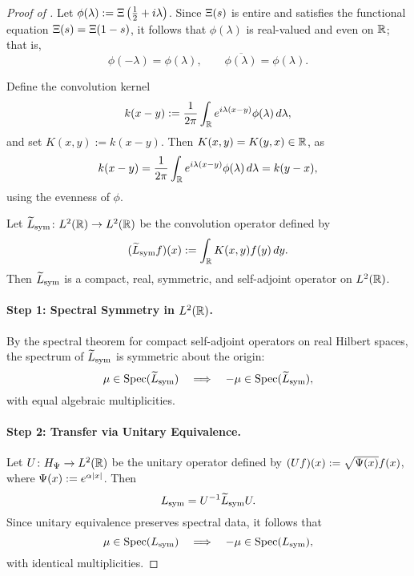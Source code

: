 \begin{proof}[Proof of ]
Let \( \phi(\lambda) := \Xi\left(\tfrac{1}{2} + i\lambda\right) \). Since \( \Xi(s) \) is entire and satisfies the functional equation \( \Xi(s) = \Xi(1 - s) \), it follows that \( \phi(\lambda) \) is real-valued and even on \( \mathbb{R} \); that is,
\[
\phi(-\lambda) = \phi(\lambda), \qquad \overline{\phi(\lambda)} = \phi(\lambda).
\]

Define the convolution kernel
\[
k(x - y) := \frac{1}{2\pi} \int_{\mathbb{R}} e^{i\lambda(x - y)} \phi(\lambda)\, d\lambda,
\]
and set \( K(x, y) := k(x - y) \). Then \( K(x, y) = K(y, x) \in \mathbb{R} \), as
\[
k(x - y) = \frac{1}{2\pi} \int_{\mathbb{R}} e^{i\lambda(x - y)} \phi(\lambda)\, d\lambda = k(y - x),
\]
using the evenness of \( \phi \).

Let \( \widetilde{L}_{\mathrm{sym}} \colon L^2(\mathbb{R}) \to L^2(\mathbb{R}) \) be the convolution operator defined by
\[
(\widetilde{L}_{\mathrm{sym}} f)(x) := \int_{\mathbb{R}} K(x, y) f(y)\, dy.
\]
Then \( \widetilde{L}_{\mathrm{sym}} \) is a compact, real, symmetric, and self-adjoint operator on \( L^2(\mathbb{R}) \).

\paragraph{Step 1: Spectral Symmetry in \( L^2(\mathbb{R}) \).}
By the spectral theorem for compact self-adjoint operators on real Hilbert spaces, the spectrum of \( \widetilde{L}_{\mathrm{sym}} \) is symmetric about the origin:
\[
\mu \in \operatorname{Spec}(\widetilde{L}_{\mathrm{sym}}) \quad \Longrightarrow \quad -\mu \in \operatorname{Spec}(\widetilde{L}_{\mathrm{sym}}),
\]
with equal algebraic multiplicities.

\paragraph{Step 2: Transfer via Unitary Equivalence.}
Let \( U \colon H_{\Psi} \to L^2(\mathbb{R}) \) be the unitary operator defined by \( (Uf)(x) := \sqrt{\Psi(x)} f(x) \), where \( \Psi(x) := e^{\alpha |x|} \). Then
\[
L_{\mathrm{sym}} = U^{-1} \widetilde{L}_{\mathrm{sym}} U.
\]
Since unitary equivalence preserves spectral data, it follows that
\[
\mu \in \operatorname{Spec}(L_{\mathrm{sym}}) \quad \Longrightarrow \quad -\mu \in \operatorname{Spec}(L_{\mathrm{sym}}),
\]
with identical multiplicities.
\end{proof}
